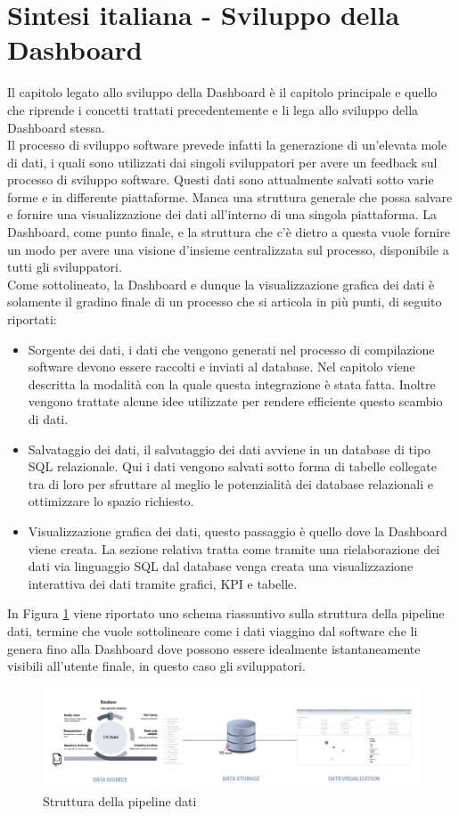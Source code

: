 \documentclass[../main.tex]{subfiles}
\begin{document}
\section{Sintesi italiana - Sviluppo della Dashboard}
Il capitolo legato allo sviluppo della Dashboard è il capitolo principale e quello che riprende i concetti trattati precedentemente  e li lega allo sviluppo della Dashboard stessa.\\
Il processo di sviluppo software prevede infatti la generazione di un'elevata mole di dati, i quali sono utilizzati dai singoli sviluppatori per avere un feedback sul processo di sviluppo software. Questi dati sono attualmente salvati sotto varie forme e in differente piattaforme. Manca una struttura generale che possa salvare e fornire una visualizzazione dei dati all'interno di una singola piattaforma. La Dashboard, come punto finale, e la struttura che c'è dietro a questa vuole fornire un modo per avere una visione d'insieme centralizzata sul processo, disponibile a tutti gli sviluppatori.\\
Come sottolineato, la Dashboard e dunque la visualizzazione grafica dei dati è solamente il gradino finale di un processo che si articola in più punti, di seguito riportati:
\begin{itemize}
    \item Sorgente dei dati, i dati che vengono generati nel processo di compilazione software devono essere raccolti e inviati al database. Nel capitolo viene descritta la modalità con la quale questa integrazione è stata fatta. Inoltre vengono trattate alcune idee utilizzate per rendere efficiente questo scambio di dati.
    \item Salvataggio dei dati, il salvataggio dei dati avviene in un database di tipo \gls{SQL} relazionale. Qui i dati vengono salvati sotto forma di tabelle collegate tra di loro per sfruttare al meglio le potenzialità dei database relazionali e ottimizzare lo spazio richiesto.
    \item Visualizzazione grafica dei dati, questo passaggio è quello dove la Dashboard viene creata. La sezione relativa tratta come tramite una rielaborazione dei dati via linguaggio SQL dal database venga creata una visualizzazione interattiva dei dati tramite grafici, \gls{KPI} e tabelle.
\end{itemize}
In Figura \ref{fig:pipelineita} viene riportato uno schema riassuntivo sulla struttura della pipeline dati, termine che vuole sottolineare come i dati viaggino dal software che li genera fino alla Dashboard dove possono essere idealmente istantaneamente visibili all'utente finale, in questo caso gli sviluppatori.
\begin{figure}[h]
    \centering
    \includegraphics[width=\linewidth]{images_folder/pipeline_1.png}
    \caption{Struttura della pipeline dati}
    \label{fig:pipelineita}
\end{figure}
\end{document}

